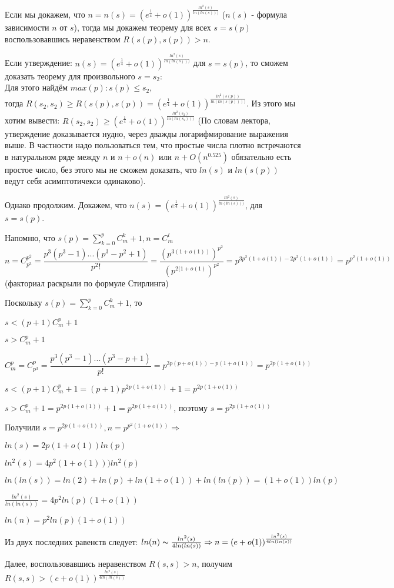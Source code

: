 Если мы докажем, что 
$n = n(s) = (e^{\frac{1}{4}} + o(1))^{\frac{ln^2(s)}{ln(ln(s)))}}$ ($n(s)$ - формула зависимости $n$ от $s$), тогда мы докажем теорему для всех $s = s(p)$ воспользовавшись неравенством $R(s(p), s(p)) > n$.

Если утверждение: $n(s) =  (e^{\frac{1}{4}} + o(1))^{\frac{ln^2(s)}{ln(ln(s)))}}$ для $s = s(p)$, то сможем доказать теорему для произвольного $s = s_2$: \\ 
Для этого найдём $max(p): s(p) \leqslant s_2,$ \\
тогда $R(s_2, s_2) \geqslant R(s(p), s(p)) = (e^{\frac{1}{4}} + o(1))^{\frac{ln^2(s(p))}{ln(ln(s(p))))}}$. Из этого мы хотим вывести: $R(s_2, s_2) \geqslant (e^{\frac{1}{4}} + o(1))^{\frac{ln^2(s_2)}{ln(ln(s_2)))}}$
(По словам лектора, утверждение доказывается нудно, через дважды логарифмирование выражения выше. В частности надо пользоваться тем, что простые числа плотно встречаются в натуральном ряде между $n$ и $n + o(n)$ или $n + O(n^{0.525})$ обязательно есть простое число, без этого мы не сможем доказать, что $ln(s)$ и $ln(s(p))$ ведут себя асимптотичекси одинаково).

Однако продолжим. Докажем, что $n(s) =  (e^{\frac{1}{4}} + o(1))^{\frac{ln^2(s)}{ln(ln(s)))}}$, для $s = s(p)$.

Напомню, что $s(p) = \sum_{k=0}^p C_m^k + 1, n = C_m^l$
$$n = C_{p^3}^{p^2} = \frac{p^3 (p^3 - 1) ... (p^3 - p^2 + 1)}{p^2!} = \frac{(p^{3(1+o(1))})^{p^2}}{(p^{2(1+o(1)})^{p^2}} = p^{3p^2(1 + o(1)) - 2p^2(1 + o(1))} = p^{p^2(1 + o(1))}$$ (факториал раскрыли по формуле Стирлинга) 

Поскольку $s(p) = \sum_{k=0}^p C_m^k + 1$, то

$s < (p + 1) C_m^p + 1$

$s > C_m^p + 1$

$$C_m^p = C_{p^3}^p = \frac{p^3(p^3-1)...(p^3-p+1)}{p!}= p^{3p(p+o(1))-p(1+o(1))} = p^{2p(1+o(1))}$$

$s < (p + 1) C_m^p + 1 = (p+1) p^{2p(1+o(1))} + 1 = p^{2p(1+o(1))}$

$s > C_m^p + 1 = p^{2p(1+o(1))} + 1 = p^{2p(1+o(1))}$, поэтому $s = p^{2p(1+o(1))}$

Получили $s = p^{2p(1+o(1))}, n = p^{p^2(1+o(1))} \Rightarrow$

$ln(s) = 2p(1+o(1))ln(p)$

$ln^2(s) = 4p^2 (1+o(1)))ln^2(p)$

$ln(ln(s)) = ln(2) + ln(p) + ln(1 + o(1)) + ln(ln(p)) = (1+o(1)) ln(p)$

$\frac{ln^2(s)}{ln(ln(s))} = 4p^2 ln(p)(1 + o(1))$

$ln(n) = p^2 ln(p) (1 + o(1))$

Из двух последних равенств следует: $ ln (n) \thicksim \frac{ln^2(s)}{4 ln(ln(s))} \Rightarrow n = (e + o(1))^{\frac{ln^2(s)}{4 ln(ln(s))}}$

Далее, воспользовавшись неравенством $R(s, s) > n$, получим $R(s, s) > (e + o(1))^{\frac{ln^2(s)}{4 ln(ln(s))}}$

\EndProof


